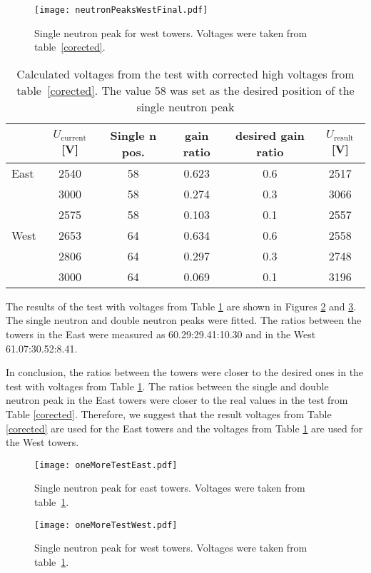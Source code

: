 \documentclass[a4paper,10pt]{article}
\begin{document}
\begin{figure}[htb]
\begin{center}
\texttt{[image: neutronPeaksWestFinal.pdf]}
\end{center}
\caption{Single neutron peak for west towers. Voltages were taken from table~\ref{corected}.}
\label{westThird}
\end{figure}

\begin{table}[htb] 
\caption{Calculated voltages from the test with corrected high voltages from table~\ref{corected}.
The value 58 was set as the desired position of the single neutron peak}
\label{thirdCalib}
\begin{center}
\begin{tabular}{lccccc}
 \toprule
 &$U_\text{current}$[V]&Single n pos.&gain ratio&desired gain ratio&$U_\text{result}$[V]\\
\midrule
East  &2540  &58 &0.623  &0.6 &2517 \\
      &3000  &58 &0.274  &0.3 &3066 \\
      &2575  &58 &0.103	&0.1 &2557 \\
\midrule
West  &2653  &64 &0.634 &0.6 &2558 \\
      &2806  &64 &0.297 &0.3 &2748 \\
      &3000  &64 &0.069 &0.1 &3196 \\
\bottomrule
\end{tabular}
\end{center}
\end{table}

The results of the test with voltages from Table \ref{thirdCalib} are shown in
Figures \ref{oneMoreTestEast} and \ref{oneMoreTestWest}\@. The single neutron and double
neutron peaks were fitted. The ratios between the towers in the East were measured as
60.29:29.41:10.30 and in the West 61.07:30.52:8.41. 

In conclusion, the ratios between the towers were closer to the desired ones in the
test with voltages from Table \ref{thirdCalib}. The ratios between the single and double
neutron peak in the East towers were closer to the real values in the test from
Table \ref{corected}. Therefore, we suggest that the result voltages from Table \ref{corected}
are used for the East towers and the voltages from Table \ref{thirdCalib} are used for the
West towers.

\begin{figure}[!htb]
\begin{center}
\texttt{[image: oneMoreTestEast.pdf]}
\end{center}
\caption{Single neutron peak for east towers. Voltages were taken from table~\ref{thirdCalib}.}
\label{oneMoreTestEast}
\end{figure}

\begin{figure}[!htb]
\begin{center}
\texttt{[image: oneMoreTestWest.pdf]}
\end{center}
\caption{Single neutron peak for west towers. Voltages were taken from table~\ref{thirdCalib}.}
\label{oneMoreTestWest}
\end{figure}
\end{document}
